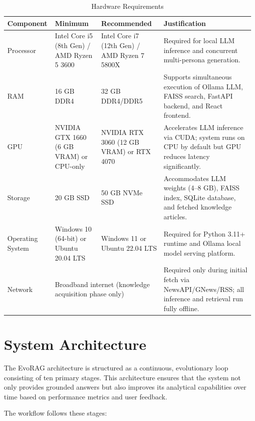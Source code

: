 \begin{table}[H]
\centering
\caption{Hardware Requirements}
\label{tab:hardware}
\renewcommand{\arraystretch}{1.5}
\footnotesize
\begin{tabularx}{\linewidth}{|p{2.2cm}|X|X|X|}
\hline
\textbf{Component} & \textbf{Minimum} & \textbf{Recommended} & \textbf{Justification} \\
\hline
Processor &
Intel Core i5 (8th Gen) / AMD Ryzen 5 3600 &
Intel Core i7 (12th Gen) / AMD Ryzen 7 5800X &
Required for local LLM inference and concurrent multi-persona generation. \\
\hline
RAM &
16 GB DDR4 &
32 GB DDR4/DDR5 &
Supports simultaneous execution of Ollama LLM, FAISS search, FastAPI backend, and React frontend. \\
\hline
GPU &
NVIDIA GTX 1660 (6 GB VRAM) or CPU-only &
NVIDIA RTX 3060 (12 GB VRAM) or RTX 4070 &
Accelerates LLM inference via CUDA; system runs on CPU by default but GPU reduces latency significantly. \\
\hline
Storage &
20 GB SSD &
50 GB NVMe SSD &
Accommodates LLM weights (4--8 GB), FAISS index, SQLite database, and fetched knowledge articles. \\
\hline
Operating System &
Windows 10 (64-bit) or Ubuntu 20.04 LTS &
Windows 11 or Ubuntu 22.04 LTS &
Required for Python 3.11+ runtime and Ollama local model serving platform. \\
\hline
Network &
\multicolumn{2}{X|}{Broadband internet (knowledge acquisition phase only)} &
Required only during initial fetch via NewsAPI/GNews/RSS; all inference and retrieval run fully offline. \\
\hline
\end{tabularx}
\end{table}

\section{System Architecture}

The EvoRAG architecture is structured as a continuous, evolutionary loop consisting of ten primary stages. This architecture ensures that the system not only provides grounded answers but also improves its analytical capabilities over time based on performance metrics and user feedback.

The workflow follows these stages:

